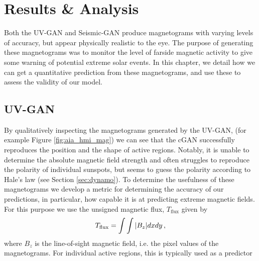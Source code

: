 \documentclass[11pt,a4paper,onecolumn]{report}
\begin{document}
%
%
%
%
%
%
%
\chapter{Results \& Analysis}
%
%
%
%
%
%
\label{chap:results_and_analysis}

Both the UV-GAN and Seismic-GAN produce magnetograms with varying levels of
accuracy, but appear physically realistic to the eye. The purpose of generating
these magnetograms was to monitor the level of farside magnetic activity to give
some warning of potential extreme solar events. In this chapter, we detail how
we can get a quantitative prediction from these magnetograms, and use these to
assess the validity of our model. 

\section{UV-GAN}
By qualitatively inspecting the magnetograms generated by the UV-GAN, (for
example Figure \ref{fig:aia_hmi_mag}) we can see that the cGAN successfully
reproduces the position and the shape of active regions. Notably, it is
unable to determine the absolute magnetic field strength and often struggles to
reproduce the polarity of individual sunspots, but seems to guess the polarity
according to Hale's law (see Section \ref{sec:dynamo}).
To determine the usefulness of these magnetograms we develop a metric for
determining the accuracy of our predictions, in particular, how capable it is at
predicting extreme magnetic fields. 
For this purpose we use the unsigned magnetic flux,
\(T_{\text{flux}}\) given by
\begin{align}
  T_{\text{flux}} = \int \int \absolutevalue{B_z} dx dy \, ,
\end{align}
where \(B_z\) is the line-of-sight magnetic field, i.e. the pixel values of the
magnetograms. For individual active regions, this is typically used as a predictor
\end{document}
